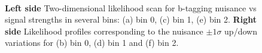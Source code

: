 \begin{figure}[htb]
\\

\caption{{\bf Left side} Two-dimensional likelihood scan for b-tagging nuisance vs signal strengths in several bins: (a) bin 0, (c) bin 1, (e) bin 2. {\bf Right side} Likelihood profiles corresponding to the nuisance $\pm 1 \sigma$ up/down variations for (b) bin 0, (d) bin 1 and (f) bin 2. \label{fig:btagsf_bananas_p1}}
\end{figure}

